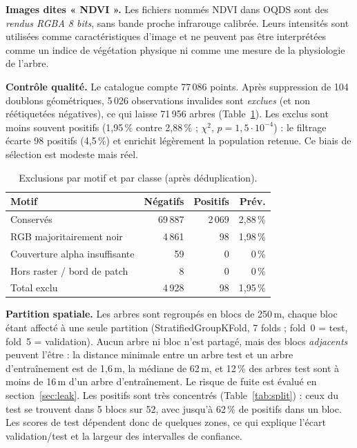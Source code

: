 \documentclass[10pt,a4paper,twocolumn]{article}
\begin{document}
\textbf{Images dites « NDVI ».} Les fichiers nommés NDVI dans OQDS sont des \emph{rendus RGBA 8 bits}, sans bande proche
infrarouge calibrée. Leurs intensités sont utilisées comme caractéristiques d'image et ne peuvent pas être interprétées comme un
indice de végétation physique ni comme une mesure de la physiologie de l'arbre.

\textbf{Contrôle qualité.} Le catalogue compte 77\,086 points. Après suppression de 104 doublons géométriques, 5\,026
observations invalides sont \emph{exclues} (et non réétiquetées négatives), ce qui laisse 71\,956 arbres
(Table~\ref{tab:qc}). Les exclus sont moins souvent positifs (1,95\,\% contre 2,88\,\% ; $\chi^2$, $p=1{,}5\cdot10^{-4}$) : le
filtrage écarte 98 positifs (4,5\,\%) et enrichit légèrement la population retenue. Ce biais de sélection est modeste mais réel.

\begin{table}[t]
\centering\small
\caption{Exclusions par motif et par classe (après déduplication).}
\label{tab:qc}
\setlength{\tabcolsep}{4pt}
\begin{tabular}{@{}lrrr@{}}
\toprule
Motif & Négatifs & Positifs & Prév. \\
\midrule
Conservés & 69\,887 & 2\,069 & 2,88\,\% \\
RGB majoritairement noir & 4\,861 & 98 & 1,98\,\% \\
Couverture alpha insuffisante & 59 & 0 & 0\,\% \\
Hors raster / bord de patch & 8 & 0 & 0\,\% \\
\midrule
Total exclu & 4\,928 & 98 & 1,95\,\% \\
\bottomrule
\end{tabular}
\end{table}

\textbf{Partition spatiale.} Les arbres sont regroupés en blocs de 250\,m, chaque bloc étant affecté à une seule partition
(StratifiedGroupKFold, 7 folds ; fold~0 = test, fold~5 = validation). Aucun arbre ni bloc n'est partagé, mais des blocs
\emph{adjacents} peuvent l'être : la distance minimale entre un arbre test et un arbre d'entraînement est de 1,6\,m, la médiane
de 62\,m, et 12\,\% des arbres test sont à moins de 16\,m d'un arbre d'entraînement. Le risque de fuite est évalué en
section~\ref{sec:leak}. Les positifs sont très concentrés (Table~\ref{tab:split}) : ceux du test se trouvent dans 5 blocs sur
52, avec jusqu'à 62\,\% de positifs dans un bloc. Les scores de test dépendent donc de quelques zones, ce qui explique
l'écart validation/test et la largeur des intervalles de confiance.
\end{document}
